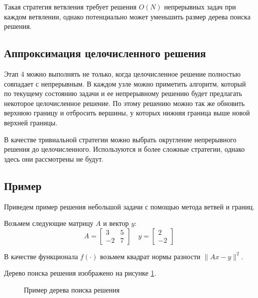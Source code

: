 \documentclass[12pt]{article}
\begin{document}
Такая стратегия ветвления требует решения $O(N)$ непрерывных задач при каждом ветвлении, однако потенциально может уменьшить размер дерева 
поиска решения.

\subsection{Аппроксимация целочисленного решения}
Этап 4 можно выполнять не только, когда целочисленное решение полностью совпадает с непрерывным. В каждом узле можно приметить алгоритм, который по текущему состоянию задачи и ее непрерывному решению будет предлагать некоторое целочисленное решение. По этому решению можно так же обновить верхнюю границу и отбросить вершины, у которых нижняя граница выше новой верхней границы. 

В качестве тривиальной стратегии можно выбрать округление непрерывного решения до целочисленного. Используются и более сложные стратегии, однако здесь они рассмотрены не будут.

\subsection{Пример}
Приведем пример решения небольшой задачи с помощью метода ветвей и границ.

Возьмем следующие матрицу $A$ и вектор $y$:
$$
A = \begin{bmatrix} 3 & 5 \\ -2 & 7 \end{bmatrix}
\quad y = \begin{bmatrix} 2 \\ -2 \end{bmatrix}
$$

В качестве функционала $f(\cdot)$ возьмем квадрат нормы разности $\|Ax - y\|^2$.

Дерево поиска решения изображено на рисунке \ref{example}.

\begin{figure}[H]
    \centering
    \caption{Пример дерева поиска решения}
    \label{example}
\end{figure}
\end{document}
